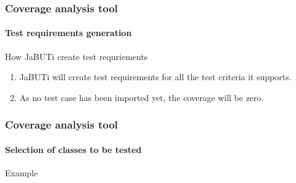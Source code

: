 \begin{frame}[parent={cmap:coverage-analysis-tool},hasnext=true,hasprev=true]
\frametitle{Coverage analysis tool}
\framesubtitle{Test requirements generation}

\begin{block:procedure}{How JaBUTi create test requriements}
\begin{enumerate}
	\item JaBUTi will create test requirements for all the test criteria it
	supports.

	\item As no test case has been imported yet, the coverage will be zero.
\end{enumerate}
\end{block:procedure}
\end{frame}



\begin{frame}[imacidie]
\frametitle{Coverage analysis tool}
\framesubtitle{Selection of classes to be tested}

\begin{block}{Example}
\end{block}
\end{frame}
